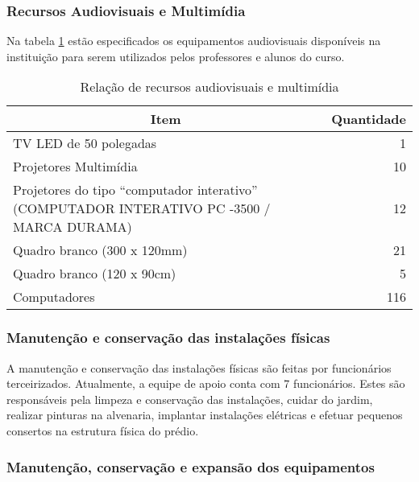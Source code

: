 \subsubsection{Recursos Audiovisuais e Multimídia}

Na tabela \ref{table:audiovisual} estão especificados os equipamentos audiovisuais disponíveis na instituição para serem utilizados pelos professores e alunos do curso.

\begin{table}[h]
\caption{Relação de recursos audiovisuais e multimídia}
\begin{center}
\begin{tabular}{|p{12cm}|r|}
\hline
\multicolumn{1}{|c|}{\textbf{Item}} & \multicolumn{1}{c|}{\textbf{Quantidade}} \\ \hline
TV  LED de 50 polegadas             & 1                                        \\ \hline
Projetores Multimídia               & 10                                        \\ \hline
Projetores do tipo ``computador interativo'' (COMPUTADOR INTERATIVO PC -3500 / MARCA DURAMA) & 12 \\ \hline
Quadro branco (300 x 120mm)         & 21                                       \\ \hline
Quadro branco (120 x 90cm)          & 5											\\ \hline 
Computadores                        & 116                                       \\ \hline
\end{tabular}
\end{center}
\label{table:audiovisual}
\end{table}

\subsubsection{Manutenção e conservação das instalações físicas}

A manutenção e conservação das instalações físicas são feitas por funcionários terceirizados. Atualmente, a equipe de apoio conta com 7 funcionários. Estes são responsáveis pela limpeza e conservação das instalações, cuidar do jardim, realizar pinturas na alvenaria, implantar instalações elétricas e efetuar pequenos consertos na estrutura física do prédio.

\subsubsection{Manutenção, conservação e expansão dos equipamentos}

